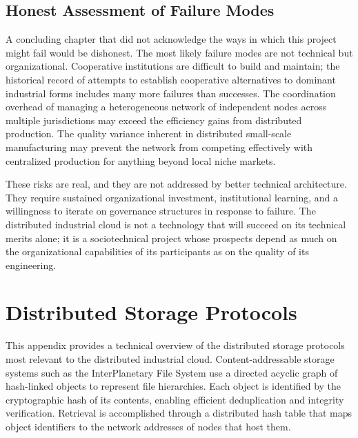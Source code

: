 \documentclass[12pt]{book}
\theoremstyle{definition}
\theoremstyle{remark}
\begin{document}
\section{Honest Assessment of Failure Modes}

A concluding chapter that did not acknowledge the ways in which this
project might fail would be dishonest. The most likely failure modes
are not technical but organizational. Cooperative institutions are
difficult to build and maintain; the historical record of attempts
to establish cooperative alternatives to dominant industrial forms
includes many more failures than successes. The coordination overhead
of managing a heterogeneous network of independent nodes across
multiple jurisdictions may exceed the efficiency gains from
distributed production. The quality variance inherent in
distributed small-scale manufacturing may prevent the network from
competing effectively with centralized production for anything
beyond local niche markets.

These risks are real, and they are not addressed by better technical
architecture. They require sustained organizational investment,
institutional learning, and a willingness to iterate on governance
structures in response to failure. The distributed industrial cloud
is not a technology that will succeed on its technical merits alone;
it is a sociotechnical project whose prospects depend as much on the
organizational capabilities of its participants as on the quality
of its engineering.


\appendix

\chapter{Distributed Storage Protocols}

This appendix provides a technical overview of the distributed
storage protocols most relevant to the distributed industrial cloud.
Content-addressable storage systems such as the InterPlanetary File
System use a directed acyclic graph of hash-linked objects to
represent file hierarchies. Each object is identified by the
cryptographic hash of its contents, enabling efficient deduplication
and integrity verification. Retrieval is accomplished through a
distributed hash table that maps object identifiers to the network
addresses of nodes that host them.
\end{document}

